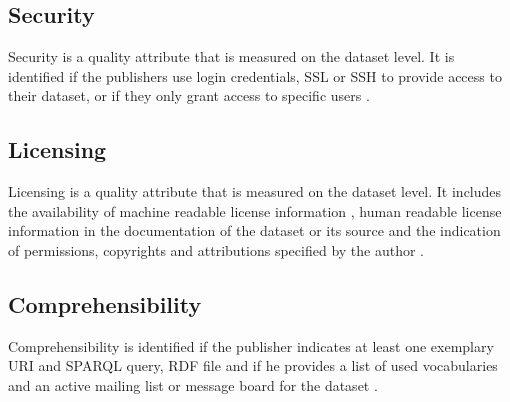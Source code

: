 \documentclass[onecolumn, crcready]{iosart2c}
\begin{document}
\subsection{Security}

Security is a quality attribute that is measured on the dataset level. It is identified if the publishers use login credentials, SSL or SSH to provide access to their dataset, or if they only grant access to specific users \cite{Framework2012}.

\subsection{Licensing}

Licensing is a quality attribute that is measured on the dataset level. It includes the availability of machine readable license information \cite{Hogan:2012:ESL:2263498.2264570}, human readable license information in the documentation of the dataset or its source \cite{Hogan:2012:ESL:2263498.2264570} and the indication of permissions, copyrights and attributions specified by the author \cite{Framework2012}.

\subsection{Comprehensibility}

Comprehensibility is identified if the publisher indicates at least one exemplary URI and SPARQL query, RDF file and if he provides a list of used vocabularies and an active mailing list or message board for the dataset \cite{flemming2010}.
\end{document}
